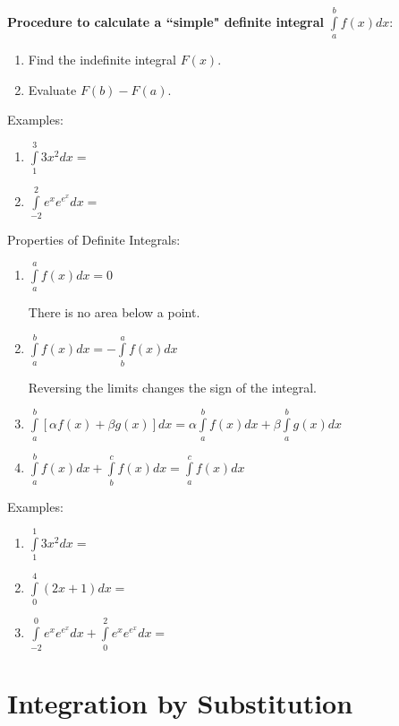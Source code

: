 \documentclass[]{book}
\providecommand{\tightlist}{%
  \setlength{\itemsep}{0pt}\setlength{\parskip}{0pt}}
\theoremstyle{definition}
\theoremstyle{definition}
\theoremstyle{definition}
\theoremstyle{remark}
\begin{document}
\textbf{Procedure to calculate a ``simple" definite integral}
\(\int\limits_a^b f(x)dx\):

\begin{enumerate}
\def\labelenumi{\arabic{enumi}.}
\tightlist
\item
  Find the indefinite integral \(F(x)\).
\item
  Evaluate \(F(b)-F(a)\).
\end{enumerate}

\begin{framed}
Examples:
\begin{enumerate}
        \item $\int\limits_1^3 3x^2 dx=  $
        \item $\int\limits_{-2}^2 e^x e^{e^x} dx =$
\end{enumerate}
\end{framed}

Properties of Definite Integrals:

\begin{enumerate}
        \item \parbox[t]{2in}{$\int\limits_a^a f(x)dx=0$}\parbox[t]{4in}{There is no area below a point.}
        \item \parbox[t]{2in}{$\int\limits_a^b f(x)dx=-\int\limits_b^a f(x)dx$}\parbox[t]{4in}{Reversing the limits changes the sign of the integral.}
        \item $\int\limits_a^b [\alpha f(x)+\beta g(x)]dx = \alpha \int\limits_a^b f(x)dx + \beta \int\limits_a^b g(x)dx$
        \item $\int\limits_a^b f(x) dx +\int\limits_b^c f(x)dx = \int\limits_a^c f(x)dx$
\end{enumerate}

\begin{framed}
Examples:
\begin{enumerate}
        \item $\int\limits_1^1 3x^2 dx = $ 
        \item $\int\limits_0^4 (2x+1)dx= $ 
        \item $\int\limits_{-2}^0 e^x e^{e^x} dx + \int\limits_0^2 e^x e^{e^x} dx =$
    \end{enumerate}
\end{framed}

\section{Integration by Substitution}\label{integration-by-substitution}
\end{document}
